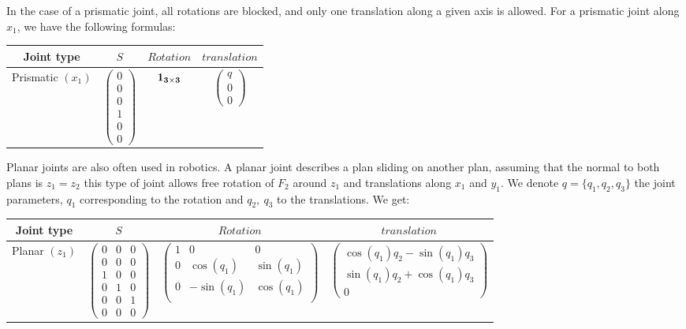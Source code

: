 In the case of a prismatic joint, all rotations are blocked, and only one translation along a given axis is allowed.
For a prismatic joint along $x_1$, we have the following formulas:

\begin{tabular}{|c|c|c|c|}
  \hline
  Joint type & $S$ & $Rotation$ & $translation$ \\
  \hline
  Prismatic $(x_1)$
  &
  $\begin{pmatrix}
    0 \\ 0 \\ 0 \\ 1 \\ 0 \\ 0
  \end{pmatrix}$
  &
  $\bf{1}_{3\times3} $
  &
  $\begin{pmatrix}
    q \\ 0 \\ 0
  \end{pmatrix}$
  \\
  \hline
\end{tabular}

Planar joints are also often used in robotics. A planar joint describes a plan sliding on another plan, assuming that the normal to both plans is $z_1 = z_2$ this type of joint allows free rotation of $F_2$ around $z_1$ and translations along $x_1$ and $y_1$. We denote $q = \{q_1, q_2, q_3\}$ the joint parameters, $q_1$ corresponding to the rotation and $q_2,\ q_3$ to the translations. We get:

\begin{tabular}{|c|c|c|c|}
  \hline
  Joint type & $S$ & $Rotation$ & $translation$ \\
  \hline
  Planar $(z_1)$
  &
  $\begin{pmatrix}
    0 & 0 & 0 \\ 0 & 0 & 0 \\ 1 & 0 & 0 \\ 0 & 1 & 0 \\ 0 & 0 & 1 \\ 0 & 0 & 0
  \end{pmatrix}$
  &
  $\begin{pmatrix}
    1 & 0 & 0 \\
    0 & \cos(q_1) & \sin(q_1) \\
    0 & -\sin(q_1) & \cos(q_1) \\
  \end{pmatrix}$
  &
  $\begin{pmatrix}
    \cos(q_1)q_2 - \sin(q_1)q_3 \\ \sin(q_1)q_2 + \cos(q_1)q_3 \\ 0
  \end{pmatrix}$
  \\
  \hline
\end{tabular}


